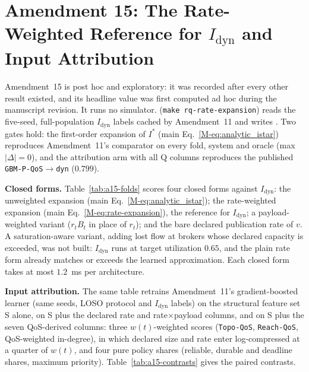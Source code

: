 \section{Amendment 15: The Rate-Weighted Reference for \texorpdfstring{$I_{\text{dyn}}$}{I\_dyn} and Input Attribution}
\label{supp:advisor-v6}

Amendment~15 is post hoc and exploratory: it was recorded after every other result existed, and its headline value was first computed ad hoc during the manuscript revision. It runs no simulator.  (\texttt{make rq-rate-expansion}) reads the five-seed, full-population $I_{\text{dyn}}$ labels cached by Amendment~11 and writes . Two gates hold: the first-order expansion of $I^*$ (main Eq.~\eqref{M-eq:analytic_istar}) reproduces Amendment~11's comparator on every fold, system and oracle (max $|\Delta| = 0$), and the attribution arm with all Q columns reproduces the published \texttt{GBM-P-QoS$\to$dyn} ($0.799$).

\noindent\textbf{Closed forms.} Table~\ref{tab:a15-folds} scores four closed forms against $I_{\text{dyn}}$: the unweighted expansion (main Eq.~\eqref{M-eq:analytic_istar}); the rate-weighted expansion (main Eq.~\eqref{M-eq:rate-expansion}), the reference for $I_{\text{dyn}}$; a payload-weighted variant ($r_t B_t$ in place of $r_t$); and the bare declared publication rate of $v$. A saturation-aware variant, adding lost flow at brokers whose declared capacity is exceeded, was not built: $I_{\text{dyn}}$ runs at target utilization $0.65$, and the plain rate form already matches or exceeds the learned approximation. Each closed form takes at most $1.2$~ms per architecture.

\noindent\textbf{Input attribution.} The same table retrains Amendment~11's gradient-boosted learner (same seeds, LOSO protocol and $I_{\text{dyn}}$ labels) on the structural feature set S alone, on S plus the declared rate and rate$\times$payload columns, and on S plus the seven QoS-derived columns: three $w(t)$-weighted scores (\texttt{Topo-QoS}, \texttt{Reach-QoS}, QoS-weighted in-degree), in which declared size and rate enter log-compressed at a quarter of $w(t)$, and four pure policy shares (reliable, durable and deadline shares, maximum priority). Table~\ref{tab:a15-contrasts} gives the paired contrasts.

